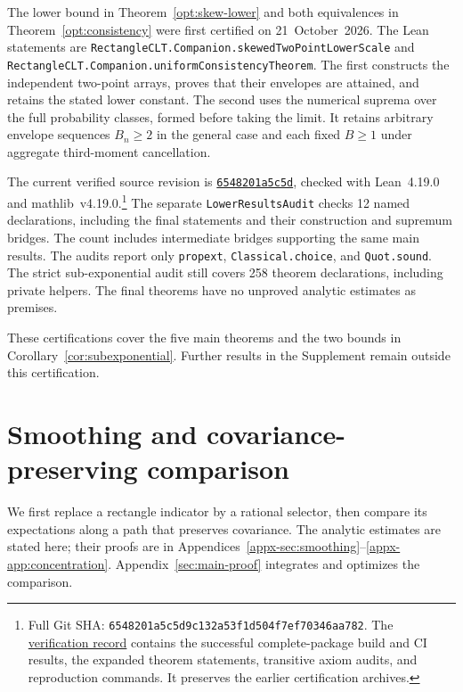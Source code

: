 \documentclass[11pt,letterpaper]{article}
\theoremstyle{remark}
\begin{document}
The lower bound in Theorem~\ref{opt:skew-lower} and both equivalences in
Theorem~\ref{opt:consistency} were first certified on 21~October~2026.
The Lean statements are
\nolinkurl{RectangleCLT.Companion.skewedTwoPointLowerScale} and
\nolinkurl{RectangleCLT.Companion.uniformConsistencyTheorem}.
The first constructs the independent two-point arrays, proves that their
envelopes are attained, and retains the stated lower constant.
The second uses the numerical suprema over the full probability classes,
formed before taking the limit. It retains arbitrary envelope sequences
\(B_n\ge2\) in the general case and each fixed \(B\ge1\) under
aggregate third-moment cancellation.

The current verified source revision is
\href{https://github.com/VC2015/HDCLTs/commit/6548201a5c5d9c132a53f1d504f7ef70346aa782}{\texttt{6548201a5c5d}},
checked with Lean~4.19.0 and mathlib~v4.19.0.\footnote{Full Git SHA:
\nolinkurl{6548201a5c5d9c132a53f1d504f7ef70346aa782}. The
\href{https://github.com/VC2015/HDCLTs/blob/bbf1ab99c733a398c181ca8c9f5a243a41f258c6/verification/2026-10-21-companion-results/README.md}{verification record}
contains the successful complete-package build and CI results,
the expanded theorem statements, transitive axiom audits, and
reproduction commands. It preserves the earlier certification archives.}
The separate \nolinkurl{LowerResultsAudit} checks 12 named declarations,
including the final statements and their construction and supremum bridges.
The count includes intermediate bridges supporting the same main results.
The audits report only \texttt{propext}, \texttt{Classical.choice}, and
\texttt{Quot.sound}. The strict sub-exponential audit still covers
258 theorem declarations, including private helpers. The final theorems
have no unproved analytic estimates as premises.

These certifications cover the five main theorems and the two bounds in
Corollary~\ref{cor:subexponential}. Further results in the Supplement
remain outside this certification.

\section{Smoothing and covariance-preserving comparison}
\label{sec:smoothing}\label{sec:support}

We first replace a rectangle indicator by a rational selector, then
compare its expectations along a path that preserves covariance.
The analytic estimates are stated here; their proofs are in
Appendices~\ref{appx-sec:smoothing}--\ref{appx-app:concentration}.
Appendix~\ref{sec:main-proof} integrates and optimizes the comparison.
\end{document}
